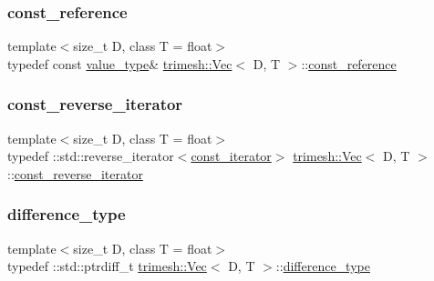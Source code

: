 \mbox{\label{classtrimesh_1_1Vec_a5ae45a41f93e04534f46b74dee5c6701}} 
\subsubsection{\texorpdfstring{const\+\_\+reference}{const\_reference}}
{\footnotesize\ttfamily template$<$size\+\_\+t D, class T = float$>$ \\
typedef const \hyperlink{classtrimesh_1_1Vec_a10a59253996e42d67c713f37592669df}{value\+\_\+type}\& \hyperlink{classtrimesh_1_1Vec}{trimesh\+::\+Vec}$<$ D, T $>$\+::\hyperlink{classtrimesh_1_1Vec_a5ae45a41f93e04534f46b74dee5c6701}{const\+\_\+reference}}

\mbox{\label{classtrimesh_1_1Vec_a0f78ea50431013f8f15b6286efc0dccd}} 
\subsubsection{\texorpdfstring{const\+\_\+reverse\+\_\+iterator}{const\_reverse\_iterator}}
{\footnotesize\ttfamily template$<$size\+\_\+t D, class T = float$>$ \\
typedef \+::std\+::reverse\+\_\+iterator$<$\hyperlink{classtrimesh_1_1Vec_a3bd4f0e8856d283ef56a63a106881bb9}{const\+\_\+iterator}$>$ \hyperlink{classtrimesh_1_1Vec}{trimesh\+::\+Vec}$<$ D, T $>$\+::\hyperlink{classtrimesh_1_1Vec_a0f78ea50431013f8f15b6286efc0dccd}{const\+\_\+reverse\+\_\+iterator}}

\mbox{\label{classtrimesh_1_1Vec_aa3601a21f245436382d7e9ffdd225e6d}} 
\subsubsection{\texorpdfstring{difference\+\_\+type}{difference\_type}}
{\footnotesize\ttfamily template$<$size\+\_\+t D, class T = float$>$ \\
typedef \+::std\+::ptrdiff\+\_\+t \hyperlink{classtrimesh_1_1Vec}{trimesh\+::\+Vec}$<$ D, T $>$\+::\hyperlink{classtrimesh_1_1Vec_aa3601a21f245436382d7e9ffdd225e6d}{difference\+\_\+type}}

